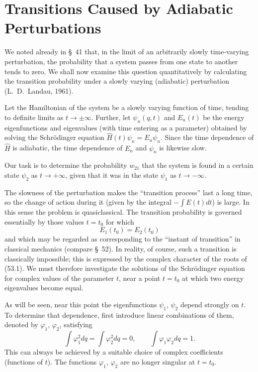 \section{Transitions Caused by Adiabatic Perturbations}

We noted already in §~41 that, in the limit of an arbitrarily slowly time-varying perturbation, the probability that a system passes from one state to another tends to zero. We shall now examine this question quantitatively by calculating the transition probability under a slowly varying (adiabatic) perturbation (L.~D.~Landau, 1961).

Let the Hamiltonian of the system be a slowly varying function of time, tending to definite limits as $t\to\pm\infty$. Further, let $\psi_n(q,t)$ and $E_n(t)$ be the energy eigenfunctions and eigenvalues (with time entering as a parameter) obtained by solving the Schrödinger equation $\widehat H(t)\psi_n=E_n\psi_n$. Since the time dependence of $\widehat H$ is adiabatic, the time dependence of $E_n$ and $\psi_n$ is likewise slow.

Our task is to determine the probability $w_{21}$ that the system is found in a certain state $\psi_2$ as $t\to+\infty$, given that it was in the state $\psi_1$ as $t\to-\infty$.

The slowness of the perturbation makes the ``transition process'' last a long time, so the change of action during it (given by the integral $-\int E(t)dt$) is large. In this sense the problem is quasiclassical. The transition probability is governed essentially by those values $t=t_0$ for which
\begin{equation}
 E_1(t_0)=E_2(t_0)
 \tag{53.1}
\end{equation}
and which may be regarded as corresponding to the ``instant of transition'' in classical mechanics (compare §~52). In reality, of course, such a transition is classically impossible; this is expressed by the complex character of the roots of (53.1). We must therefore investigate the solutions of the Schrödinger equation for complex values of the parameter $t$, near a point $t=t_0$ at which two energy eigenvalues become equal.

As will be seen, near this point the eigenfunctions $\psi_1$, $\psi_2$ depend strongly on $t$. To determine that dependence, first introduce linear combinations of them, denoted by $\varphi_1$, $\varphi_2$, satisfying
\begin{equation}
 \int\varphi_1^2dq=\int\varphi_2^2dq=0,\qquad
 \int\varphi_1\varphi_2dq=1.
 \tag{53.2}
\end{equation}
This can always be achieved by a suitable choice of complex coefficients (functions of $t$). The functions $\varphi_1$, $\varphi_2$ are no longer singular at $t=t_0$.

